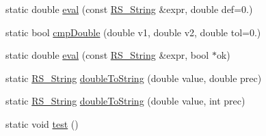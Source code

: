 \begin{DoxyCompactItemize}
\item 
static double \hyperlink{class_r_s___math_afaec7eb89cf50e3481f2970df89d9ae7}{eval} (const \hyperlink{rs__string_8h_a5adec11f318c2ae2ecdc6fe2b03be9fa}{R\-S\-\_\-\-String} \&expr, double def=0.)
\item 
static bool \hyperlink{class_r_s___math_ace7603b3950b128a1cef359d2e22ff9e}{cmp\-Double} (double v1, double v2, double tol=0.)
\item 
static double \hyperlink{class_r_s___math_a886d2291d3752bda45b3d20da597cb26}{eval} (const \hyperlink{rs__string_8h_a5adec11f318c2ae2ecdc6fe2b03be9fa}{R\-S\-\_\-\-String} \&expr, bool $\ast$ok)
\item 
static \hyperlink{rs__string_8h_a5adec11f318c2ae2ecdc6fe2b03be9fa}{R\-S\-\_\-\-String} \hyperlink{class_r_s___math_a5a03f2598d98c46aa38fce7a6e928ac9}{double\-To\-String} (double value, double prec)
\item 
static \hyperlink{rs__string_8h_a5adec11f318c2ae2ecdc6fe2b03be9fa}{R\-S\-\_\-\-String} \hyperlink{class_r_s___math_a1ba8580f960de5e63d57b3693784f890}{double\-To\-String} (double value, int prec)
\item 
static void \hyperlink{class_r_s___math_a77104690912de30774c7daa41fa52621}{test} ()
\end{DoxyCompactItemize}


